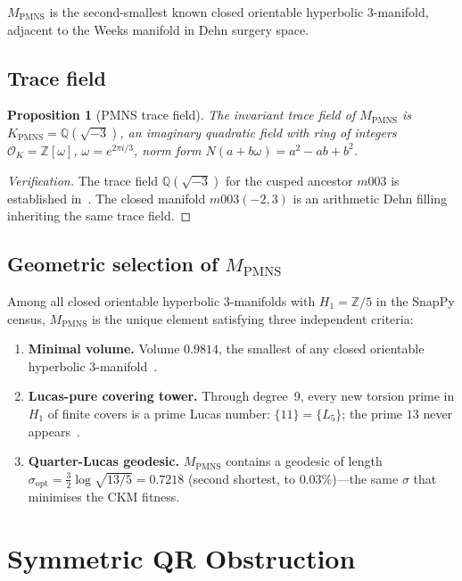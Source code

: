\documentclass[11pt,a4paper]{article}
\newtheorem{proposition}[theorem]{Proposition}
\theoremstyle{definition}
\newcommand{\MPMNS}{M_{\mathrm{PMNS}}}
\newcommand{\KPMNS}{K_{\mathrm{PMNS}}}
\newcommand{\Zom}{\mathbb{Z}[\omega]}
\newcommand{\Zfive}{\mathbb{Z}/5}
\begin{document}
$\MPMNS$ is the second-smallest known closed orientable hyperbolic
3-manifold, adjacent to the Weeks manifold in Dehn surgery space.

\subsection{Trace field}

\begin{proposition}[PMNS trace field]
The invariant trace field of $\MPMNS$ is
$\KPMNS = \mathbb{Q}(\sqrt{-3})$,
an imaginary quadratic field with ring of integers
$\mathcal{O}_K = \Zom$, $\omega = e^{2\pi i/3}$,
norm form $N(a+b\omega) = a^2-ab+b^2$.
\end{proposition}

\begin{proof}[Verification]
The trace field $\mathbb{Q}(\sqrt{-3})$ for the cusped ancestor
$m003$ is established in~\cite{Chinburg98}.
The closed manifold $m003(-2,3)$ is an arithmetic Dehn filling
inheriting the same trace field.
\end{proof}

\subsection{Geometric selection of $\MPMNS$}

Among all closed orientable hyperbolic 3-manifolds with $H_1=\Zfive$
in the SnapPy census, $\MPMNS$ is the unique element satisfying three
independent criteria:
\begin{enumerate}[(1)]
\item \textbf{Minimal volume.} Volume $0.9814$, the smallest of any
  closed orientable hyperbolic 3-manifold~\cite{GMM}.
\item \textbf{Lucas-pure covering tower.} Through degree~9, every new
  torsion prime in $H_1$ of finite covers is a prime Lucas number:
  $\{11\}=\{L_5\}$;
  the prime $13$ never appears~\cite{Gentry:Lucas,Gentry:Covering}.
\item \textbf{Quarter-Lucas geodesic.} $\MPMNS$ contains a geodesic
  of length $\sigma_{\mathrm{opt}}=\frac{3}{2}\log\sqrt{13/5}=0.7218$
  (second shortest, to
  $0.03\%$)---the same $\sigma$ that minimises the CKM fitness.
\end{enumerate}

\section{Symmetric QR Obstruction}
\label{sec:obstruction}
\end{document}
